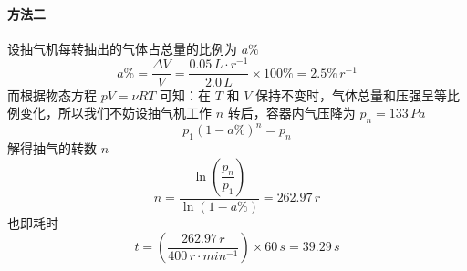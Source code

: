 \begin{solution}
    \paragraph{方法二} 设抽气机每转抽出的气体占总量的比例为 $a\%$
    $$
        a\% = \frac{\Delta V}{V}
        = \frac{
            0.05 \,\si{L \cdot r^{-1}}
        }{
            2.0 \,\si{L}
        } \times 100\%
        = 2.5\% \,\si{r^{-1}}
    $$
    而根据物态方程 $pV = \nu RT$ 可知：在 $T$ 和 $V$ 保持不变时，气体总量和压强呈等比例变化，所以我们不妨设抽气机工作 $n$ 转后，容器内气压降为 $p_n = 133 \,\si{Pa}$
    $$
        p_1 (1-a\%)^n = p_n
    $$
    解得抽气的转数 $n$
    $$
        n = \frac{\ln\left(\dfrac{p_n}{p_1}\right)}{\ln(1-a\%)}
        = 262.97 \,\si{r}
    $$
    也即耗时
    $$
        t = \left(\frac{262.97 \,\si{r}}{400 \,\si{r \cdot min^{-1}}}\right) \times 60 \,\si{s}
        = 39.29 \,\si{s}
    $$
\end{solution}

